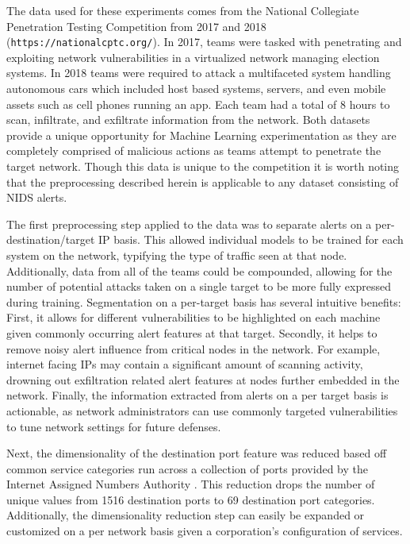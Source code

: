 The data used for these experiments comes from the National Collegiate Penetration Testing Competition from 2017 and 2018 (\texttt{https://nationalcptc.org/}). In 2017, teams were tasked with penetrating and exploiting network vulnerabilities in a virtualized network managing election systems. In 2018 teams were required to attack a multifaceted system handling autonomous cars which included host based systems, servers, and even mobile assets such as cell phones running an app. Each team had a total of 8 hours to scan, infiltrate, and exfiltrate information from the network. Both datasets provide a unique opportunity for Machine Learning experimentation as they are completely comprised of malicious actions as teams attempt to penetrate the target network. Though this data is unique to the competition it is worth noting that the preprocessing described herein is applicable to any dataset consisting of NIDS alerts.  

The first preprocessing step applied to the data was to separate alerts on a per-destination/target IP basis. This allowed individual models to be trained for each system on the network, typifying the type of traffic seen at that node. Additionally, data from all of the teams could be compounded, allowing for the number of potential attacks taken on a single target to be more fully expressed during training. Segmentation on a per-target basis has several intuitive benefits: First, it allows for different vulnerabilities to be highlighted on each machine given commonly occurring alert features at that target. Secondly, it helps to remove noisy alert influence from critical nodes in the network. For example, internet facing IPs may contain a significant amount of scanning activity, drowning out exfiltration related alert features at nodes further embedded in the network. Finally, the information extracted from alerts on a per target basis is actionable, as network administrators can use commonly targeted vulnerabilities to tune network settings for future defenses. 


Next, the dimensionality of the destination port feature was reduced based off common service categories run across a collection of ports provided by the Internet Assigned Numbers Authority \cite{iana}. This reduction drops the number of unique values from 1516 destination ports to 69 destination port categories. Additionally, the dimensionality reduction step can easily be expanded or customized on a per network basis given a corporation's configuration of services. 

